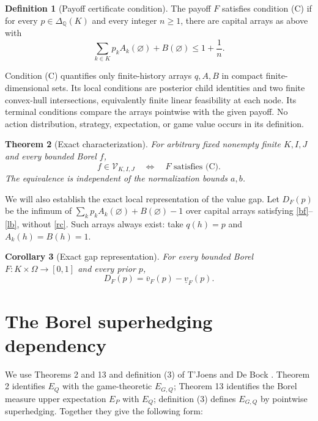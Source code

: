 \documentclass[11pt,a4paper]{article}
\newtheorem{theorem}{Theorem}
\newtheorem{corollary}[theorem]{Corollary}
\theoremstyle{definition}
\newtheorem{definition}[theorem]{Definition}
\newcommand{\lv}{\underline v}
\newcommand{\uv}{\overline v}
\begin{document}
\begin{definition}[Payoff certificate condition]
The payoff $F$ satisfies condition \textup{(C)} if for every
$p\in\Delta_{\mathbb Q}(K)$ and every integer $n\geq1$, there are capital
arrays as above with
\begin{equation}
 \sum_{k\in K}p_k A_k(\varnothing)+B(\varnothing)\leq1+\frac1n.
 \tag{RC}\label{rc}
\end{equation}
\end{definition}

Condition (C) quantifies only finite-history arrays $q,A,B$ in compact
finite-dimensional sets. Its local conditions are posterior child
identities and two finite convex-hull intersections, equivalently finite
linear feasibility at each node. Its terminal conditions compare the
arrays pointwise with the given payoff. No action distribution,
strategy, expectation, or game value occurs in its definition.

\begin{theorem}[Exact characterization]\label{main}
For arbitrary fixed nonempty finite $K,I,J$ and every bounded Borel $f$,
\[
 f\in\mathcal V_{K,I,J}\quad\Longleftrightarrow\quad
 F\text{ satisfies (C)}.
\]
The equivalence is independent of the normalization bounds $a,b$.
\end{theorem}

We will also establish the exact local representation of the value gap.
Let $D_F(p)$ be the infimum of
$\sum_k p_k A_k(\varnothing)+B(\varnothing)-1$ over capital arrays
satisfying \eqref{bf}--\eqref{lb}, without \eqref{rc}. Such arrays always
exist: take $q(h)=p$ and $A_k(h)=B(h)=1$.

\begin{corollary}[Exact gap representation]\label{rep}
For every bounded Borel $F:K\times\Omega\to[0,1]$ and every prior $p$,
\[
 D_F(p)=\uv_F(p)-\lv_F(p).
\]
\end{corollary}

\section{The Borel superhedging dependency}

We use Theorems 2 and 13 and definition (3) of T'Joens and De Bock
\cite{TDB}. Theorem 2 identifies $E_Q$ with the game-theoretic
$E_{G,Q}$; Theorem 13 identifies the Borel measure upper expectation
$E_P$ with $E_Q$; definition (3) defines $E_{G,Q}$ by pointwise
superhedging. Together they give the following form:
\end{document}

